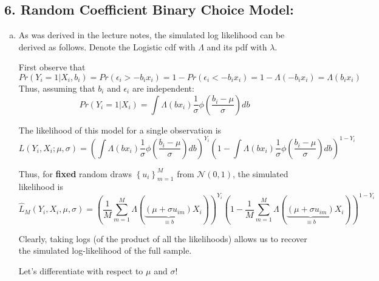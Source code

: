 \documentclass[11pt]{article}
\begin{document}
\subsection*{6. Random Coefficient Binary Choice Model:}
\begin{enumerate}[a)]
	\item As was derived in the lecture notes, the simulated log likelihood can be derived as follows. Denote the Logistic cdf with $\Lambda$ and its pdf with $\lambda$.

	First observe that
	$$Pr(Y_i = 1 | X_i, b_i) = Pr(\epsilon_i > -b_i x_i) = 1- Pr(\epsilon_i < - b_i x_i) = 1- \Lambda(-b_i x_i) = \Lambda(b_ix_i)$$
	Thus, assuming that $b_i$ and $\epsilon_i$ are independent:
	$$Pr(Y_i = 1|X_i) = \int \Lambda(b x_i) \frac{1}{\sigma}\phi(\frac{b_i - \mu}{\sigma})db$$

	The likelihood of this model for a single observation is $$L(Y_i,X_i;\mu,\sigma) = \left(\int \Lambda(b x_i) \frac{1}{\sigma}\phi(\frac{b_i - \mu}{\sigma})db\right)^{Y_i}\left(1 - \int \Lambda(b x_i) \frac{1}{\sigma}\phi(\frac{b_i - \mu}{\sigma})db\right)^{1-Y_i}$$

	Thus, for \textbf{fixed} random draws $\left\{u_i\right\}_{m=1}^{M}$ from $\mathcal{N}(0,1)$, the simulated likelihood is
	$$\hat L_M(Y_i,X_i,\mu,\sigma) 
	= 
	\left(\frac{1}{M}\sum_{m=1}^M\Lambda(\underbrace{(\mu+\sigma u_{im})}_{\equiv b}X_i)\right)^{Y_i}
	\left(1-\frac{1}{M}\sum_{m=1}^M\Lambda(\underbrace{(\mu+\sigma u_{im})}_{\equiv b}X_i)\right)^{1-Y_i}
	$$
	
	Clearly, taking logs (of the product of all the likelihoods) allows us to recover the simulated log-likelihood of the full sample. 

	Let's differentiate with respect to $\mu$ and $\sigma$!


\end{enumerate}
\end{document}
